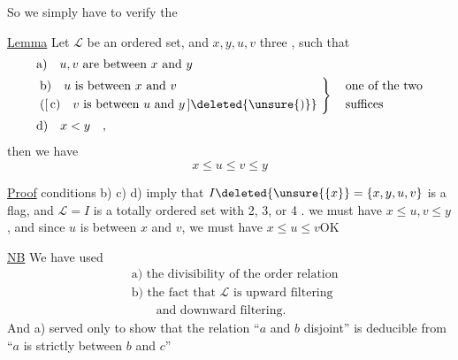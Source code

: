 So we simply have to verify the

\uline{Lemma} Let $\mathcal L$ be an ordered set, and $x,y,u,v$ three , such that
\[
\begin{aligned}
&\text{a)}\quad u,v\text{ are between }x\text{ and }y\\
&\left.\begin{aligned}
&\text{b)}\quad u\text{ is between }x\text{ and }v\\
&([\,\text{c)}\quad v\text{ is between }u\text{ and }y\,]\deleted{\unsure{)}}
\end{aligned}\ \right\}\quad
\begin{aligned}&\text{one of the two}\\&\text{suffices}\end{aligned}\\
&\text{d)}\quad x<y\quad,
\end{aligned}
\]
then we have
\[
x\leq u\leq v\leq y
\]

\uline{Proof}   conditions b) c) d) imply that $I\deleted{\unsure{\{x}}=\{x,y,u,v\}$ is a flag,  and  $\mathcal L=I$ is a totally ordered set  with 2, 3, or 4 .
    we must have $x\leq u,v\leq y$,  and since $u$ is between $x$ and $v$, we must have $x\leq u\leq v$\quad OK

\uline{NB} We have used
\[
\begin{aligned}
&\text{a) the divisibility of the order relation}\\
&\text{b) the fact that }\mathcal L\text{ is upward filtering}\\
&\hspace{2em}\text{and downward filtering.}
\end{aligned}
\]
And a) served only to show that the relation ``$a$ and $b$ disjoint'' is deducible from ``$a$ is strictly between $b$ and $c$''

